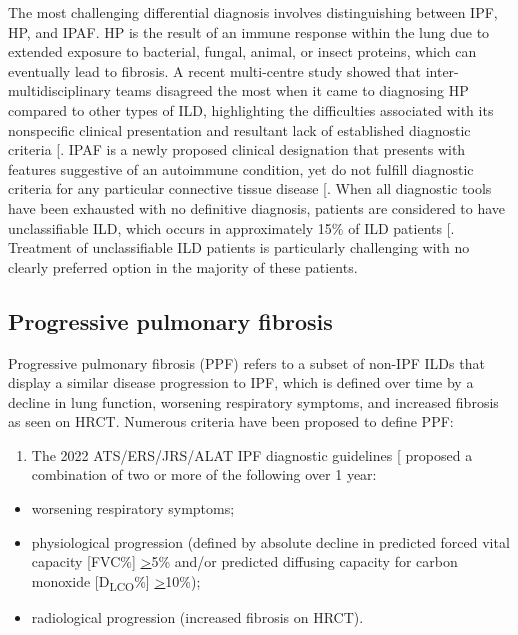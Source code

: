 \documentclass[
]{article}
\providecommand{\tightlist}{%
  \setlength{\itemsep}{0pt}\setlength{\parskip}{0pt}}
\begin{document}
The most challenging differential diagnosis involves distinguishing between IPF, HP, and IPAF. HP is the result of an immune response within the lung due to extended exposure to bacterial, fungal, animal, or insect proteins, which can eventually lead to fibrosis. A recent multi-centre study showed that inter-multidisciplinary teams disagreed the most when it came to diagnosing HP compared to other types of ILD, highlighting the difficulties associated with its nonspecific clinical presentation and resultant lack of established diagnostic criteria {[}\citeproc{ref-walsh_multicentre_2016}{16}{]}. IPAF is a newly proposed clinical designation that presents with features suggestive of an autoimmune condition, yet do not fulfill diagnostic criteria for any particular connective tissue disease {[}\citeproc{ref-graney_interstitial_2019}{17}{]}. When all diagnostic tools have been exhausted with no definitive diagnosis, patients are considered to have unclassifiable ILD, which occurs in approximately 15\% of ILD patients {[}\citeproc{ref-skolnik_unclassifiable_2016}{18}{]}. Treatment of unclassifiable ILD patients is particularly challenging with no clearly preferred option in the majority of these patients.

\subsection{Progressive pulmonary fibrosis}\label{ppf}

Progressive pulmonary fibrosis (PPF) refers to a subset of non-IPF ILDs that display a similar disease progression to IPF, which is defined over time by a decline in lung function, worsening respiratory symptoms, and increased fibrosis as seen on HRCT. Numerous criteria have been proposed to define PPF:

\begin{enumerate}
\def\labelenumi{\arabic{enumi}.}
\tightlist
\item
  The 2022 ATS/ERS/JRS/ALAT IPF diagnostic guidelines {[}\citeproc{ref-raghu_idiopathic_2022}{2}{]} proposed a combination of two or more of the following over 1 year:
\end{enumerate}

\begin{itemize}
\tightlist
\item
  worsening respiratory symptoms;
\item
  physiological progression (defined by absolute decline in predicted forced vital capacity {[}FVC\%{]} \underline{>}5\% and/or predicted diffusing capacity for carbon monoxide {[}D\textsubscript{LCO}\%{]} \underline{>}10\%);
\item
  radiological progression (increased fibrosis on HRCT).
\end{itemize}
\end{document}
